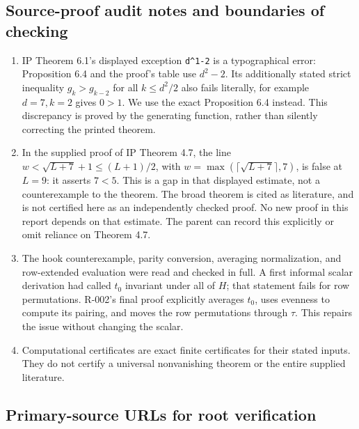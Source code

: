 \documentclass[
  10pt,
]{article}
\begin{document}
\subsection{Source-proof audit notes and boundaries of
checking}\label{source-proof-audit-notes-and-boundaries-of-checking}

\begin{enumerate}
\def\labelenumi{\arabic{enumi}.}
\item
  IP Theorem 6.1's displayed exception
  \texttt{\small d\textasciicircum{}1-\allowbreak{}2} is a typographical
  error: Proposition 6.4 and the proof's table use \(d^2-2\). Its
  additionally stated strict inequality \(g_k>g_{k-2}\) for all
  \(k\le d^2/2\) also fails literally, for example \(d=7,k=2\) gives
  \(0>1\). We use the exact Proposition 6.4 instead. This discrepancy is
  proved by the generating function, rather than silently correcting the
  printed theorem.
\item
  In the supplied proof of IP Theorem 4.7, the line
  \(w<\sqrt{L+7}+1\le(L+1)/2\), with
  \(w=\max(\lceil\sqrt{L+7}\rceil,7)\), is false at \(L=9\): it asserts
  \(7<5\). This is a gap in that displayed estimate, not a
  counterexample to the theorem. The broad theorem is cited as
  literature, and is not certified here as an independently checked
  proof. No new proof in this report depends on that estimate. The
  parent can record this explicitly or omit reliance on Theorem 4.7.
\item
  The hook counterexample, parity conversion, averaging normalization,
  and row-extended evaluation were read and checked in full. A first
  informal scalar derivation had called \(t_0\) invariant under all of
  \(H\); that statement fails for row permutations. R-002's final proof
  explicitly averages \(t_0\), uses evenness to compute its pairing, and
  moves the row permutations through \(\tau\). This repairs the issue
  without changing the scalar.
\item
  Computational certificates are exact finite certificates for their
  stated inputs. They do not certify a universal nonvanishing theorem or
  the entire supplied literature.
\end{enumerate}

\subsection{Primary-source URLs for root
verification}\label{primary-source-urls-for-root-verification}
\end{document}
